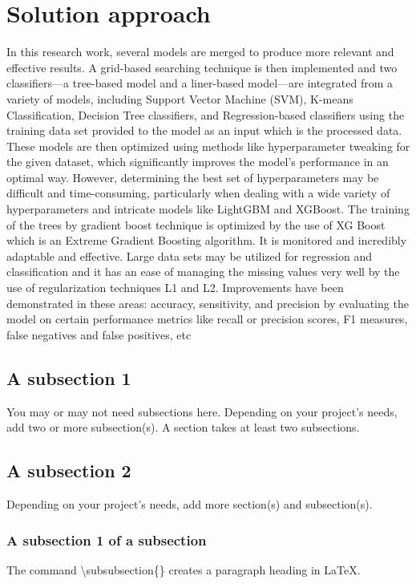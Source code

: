 \section{Solution approach}
\label{sec:intro_sol} %
In this research work, several models are merged to produce more relevant and effective results. A grid-based searching technique is then implemented and two classifiers—a tree-based model and a liner-based model—are integrated from a variety of models, including Support Vector Machine (SVM), K-means Classification, Decision Tree classifiers, and Regression-based classifiers using the training data set provided to the model as an input which is the processed data. These models are then optimized using methods like hyperparameter tweaking for the given dataset, which significantly improves the model's performance in an optimal way. However, determining the best set of hyperparameters may be difficult and time-consuming, particularly when dealing with a wide variety of hyperparameters and intricate models like LightGBM and XGBoost. The training of the trees by gradient boost technique is optimized by the use of XG Boost which is an Extreme Gradient Boosting algorithm. It is monitored and incredibly adaptable and effective. Large data sets may be utilized for regression and classification and it has an ease of managing the missing values very well by the use of regularization techniques L1 and L2. Improvements have been demonstrated in these areas: accuracy, sensitivity, and precision by evaluating the model on certain performance metrics like recall or precision scores, F1 measures, false negatives and false positives, etc

\subsection{A subsection 1}
\label{sec:intro_some_sub1}
You may or may not need subsections here. Depending on your project's needs, add two or more subsection(s). A section takes at least two subsections. 

\subsection{A subsection 2}
\label{sec:intro_some_sub2}
Depending on your project's needs, add more section(s) and subsection(s).

\subsubsection{A subsection 1 of a subsection}
\label{sec:intro_some_subsub1}
The command \textbackslash subsubsection\{\} creates a paragraph heading in \LaTeX.

